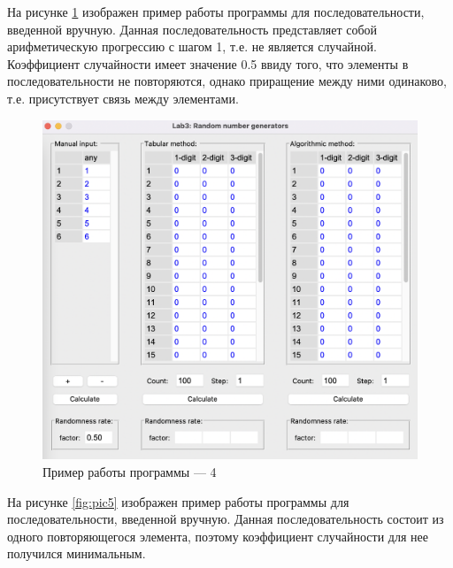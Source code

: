 \documentclass[12pt]{report}
\begin{document}
\clearpage
На рисунке \ref{fig:pic4} изображен пример работы программы для последовательности, введенной вручную. Данная последовательность представляет собой арифметическую прогрессию с шагом 1, т.е. не является случайной. Коэффициент случайности имеет значение 0.5 ввиду того, что элементы в последовательности не повторяются, однако приращение между ними одинаково, т.е. присутствует связь между элементами.

\begin{figure}[h!btp]
	\centering
	\includegraphics[width=1\textwidth]{inc/pic4.png}
	\caption{Пример работы программы --- 4}
	\label{fig:pic4}	
\end{figure}

\clearpage
На рисунке \ref{fig:pic5} изображен пример работы программы для последовательности, введенной вручную. Данная последовательность состоит из одного повторяющегося элемента, поэтому коэффициент случайности для нее получился минимальным.
\end{document}
